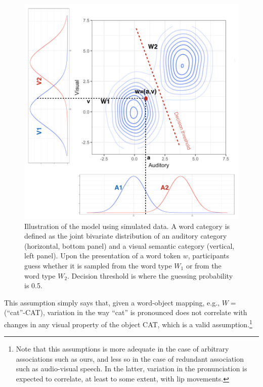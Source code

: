 \documentclass[english,floatsintext,man]{apa6}
\theoremstyle{definition}
\theoremstyle{definition}
\theoremstyle{definition}
\theoremstyle{remark}
\begin{document}
\begin{figure}[!h]
\includegraphics[width=\textwidth]{pictures/model} \caption{Illustration of the model using simulated data. A word category is defined as the joint bivariate distribution of an auditory category (horizontal, bottom panel) and a visual semantic category (vertical, left panel). Upon the presentation of a word token $w$, participants guess whether it is sampled from the word type $W_1$ or from the word type $W_2$. Decision threshold is where the guessing probability is 0.5.}\label{fig:model}
\end{figure}

\noindent This assumption simply says that, given a word-object mapping,
e.g., \(W=\)(\enquote{cat}-CAT), variation in the way \enquote{cat} is
pronounced does not correlate with changes in any visual property of the
object CAT, which is a valid
assumption.\footnote{Note that this assumptions is more adequate in the case of arbitrary associations such as ours, and less so in the case of redundant association such as audio-visual speech. In the latter, variation in the pronunciation is expected to correlate, at least to some extent, with lip movements.}
\end{document}
